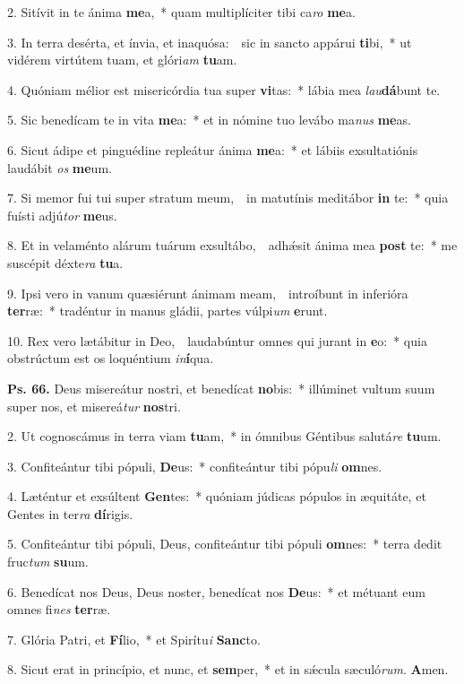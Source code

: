 
2. Sitívit in te ánima \textbf{me}a,~* quam multiplíciter tibi ca\textit{ro} \textbf{me}a.

3. In terra desérta, et ínvia, et inaquósa:~\GreDagger\ sic in sancto appárui \textbf{ti}bi,~* ut vidérem virtútem tuam, et glóri\textit{am} \textbf{tu}am.

4. Quóniam mélior est misericórdia tua super \textbf{vi}tas:~* lábia mea \textit{lau}\textbf{dá}bunt te.

5. Sic benedícam te in vita \textbf{me}a:~* et in nómine tuo levábo ma\textit{nus} \textbf{me}as.

6. Sicut ádipe et pinguédine repleátur ánima \textbf{me}a:~* et lábiis exsultatiónis laudábit \textit{os} \textbf{me}um.

7. Si memor fui tui super stratum meum,~\GreDagger\ in matutínis meditábor \textbf{in} te:~* quia fuísti adjú\textit{tor} \textbf{me}us.

8. Et in velaménto alárum tuárum exsultábo,~\GreDagger\ adh\'{\ae}sit ánima mea \textbf{post} te:~* me suscépit déxte\textit{ra} \textbf{tu}a.

9. Ipsi vero in vanum quæsiérunt ánimam meam,~\GreDagger\ introíbunt in inferióra \textbf{ter}ræ:~* tradéntur in manus gládii, partes vúlpi\textit{um} \textbf{e}runt.

10. Rex vero lætábitur in Deo,~\GreDagger\ laudabúntur omnes qui jurant in \textbf{e}o:~* quia obstrúctum est os loquéntium \textit{in}\textbf{í}qua.

\textbf{Ps. 66.} Deus misereátur nostri, et benedícat \textbf{no}bis:~* illúminet vultum suum super nos, et misereá\textit{tur} \textbf{nos}tri.

2. Ut cognoscámus in terra viam \textbf{tu}am,~* in ómnibus Géntibus salutá\textit{re} \textbf{tu}um.

3. Confiteántur tibi pópuli, \textbf{De}us:~* confiteántur tibi pópu\textit{li} \textbf{om}nes.

4. Læténtur et exsúltent \textbf{Gen}tes:~* quóniam júdicas pópulos in æquitáte, et Gentes in ter\textit{ra} \textbf{dí}rigis.

5. Confiteántur tibi pópuli, Deus, confiteántur tibi pópuli \textbf{om}nes:~* terra dedit fruc\textit{tum} \textbf{su}um.

6. Benedícat nos Deus, Deus noster, benedícat nos \textbf{De}us:~* et métuant eum omnes fi\textit{nes} \textbf{ter}ræ.

7. Glória Patri, et \textbf{Fí}lio,~* et Spirítu\textit{i} \textbf{Sanc}to.

8. Sicut erat in princípio, et nunc, et \textbf{sem}per,~* et in s\'{\ae}cula sæculó\textit{rum}. \textbf{A}men.